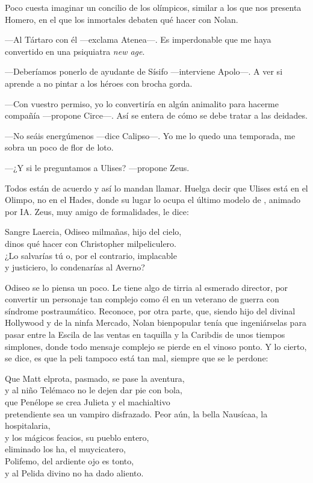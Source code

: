 \label{cap:sirenas}

Poco cuesta imaginar un concilio de los olímpicos, similar a los que nos presenta Homero, en el que los inmortales debaten qué hacer con Nolan.

---Al Tártaro con él ---exclama Atenea---. Es imperdonable que me haya convertido en una psiquiatra \emph{new age}.

---Deberíamos ponerlo de ayudante de Sísifo ---interviene Apolo---. A ver si aprende a no pintar a los héroes con brocha gorda.

---Con vuestro permiso, yo lo convertiría en algún animalito para hacerme compañía ---propone Circe---. Así se entera de cómo se debe tratar a las deidades.

---No seáis energúmenos ---dice Calipso---. Yo me lo quedo una temporada, me sobra un poco de flor de loto.

---¿Y si le preguntamos a Ulises? ---propone Zeus.

Todos están de acuerdo y así lo mandan llamar. Huelga decir que Ulises está en el Olimpo, no en el Hades, donde su lugar lo ocupa el último modelo de , animado por IA. Zeus, muy amigo de formalidades, le dice:

\begin{versopropio}
Sangre Laercia, Odiseo milmañas, hijo del cielo,\\
dinos qué hacer con Christopher milpeliculero.\\
¿Lo salvarías tú o, por el contrario, implacable\\
y justiciero, lo condenarías al Averno?
\end{versopropio}

Odiseo se lo piensa un poco. Le tiene algo de tirria al esmerado director, por convertir un personaje tan complejo como él en un veterano de guerra con síndrome postraumático. Reconoce, por otra parte, que, siendo hijo del divinal Hollywood y de la ninfa Mercado, Nolan bienpopular tenía que ingeniárselas para pasar entre la Escila de las ventas en taquilla y la Caribdis de unos tiempos simplones, donde todo mensaje complejo se pierde en el vinoso ponto. Y lo cierto, se dice, es que la peli tampoco está tan mal, siempre que se le perdone:

\begin{versopropio}
Que Matt elprota, pasmado, se pase la aventura,\\
y al niño Telémaco no le dejen dar pie con bola,\\
que Penélope se crea Julieta y el machialtivo\\
pretendiente sea un vampiro disfrazado.
\stanzabreak
Peor aún, la bella Nausícaa, la hospitalaria,\\
y los mágicos feacios, su pueblo entero,\\
eliminado los ha, el muycicatero,\\
Polifemo, del ardiente ojo es tonto,\\
y al Pelida divino no ha dado aliento.
\end{versopropio}

